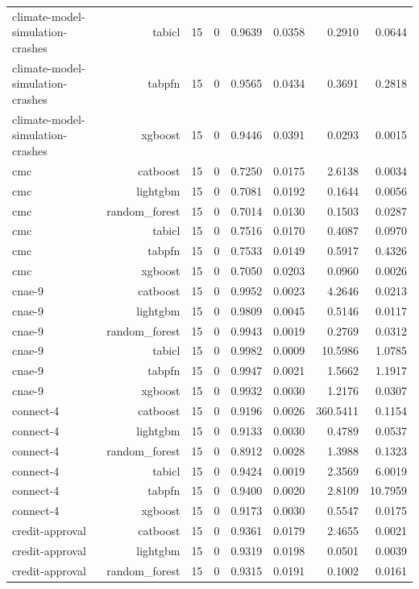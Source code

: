 \begin{table}[htbp]
\begin{tabular}{lrrrrrrr}
climate-model-simulation-crashes & tabicl & 15 & 0 & 0.9639 & 0.0358 & 0.2910 & 0.0644 \\
climate-model-simulation-crashes & tabpfn & 15 & 0 & 0.9565 & 0.0434 & 0.3691 & 0.2818 \\
climate-model-simulation-crashes & xgboost & 15 & 0 & 0.9446 & 0.0391 & 0.0293 & 0.0015 \\
cmc & catboost & 15 & 0 & 0.7250 & 0.0175 & 2.6138 & 0.0034 \\
cmc & lightgbm & 15 & 0 & 0.7081 & 0.0192 & 0.1644 & 0.0056 \\
cmc & random\_forest & 15 & 0 & 0.7014 & 0.0130 & 0.1503 & 0.0287 \\
cmc & tabicl & 15 & 0 & 0.7516 & 0.0170 & 0.4087 & 0.0970 \\
cmc & tabpfn & 15 & 0 & 0.7533 & 0.0149 & 0.5917 & 0.4326 \\
cmc & xgboost & 15 & 0 & 0.7050 & 0.0203 & 0.0960 & 0.0026 \\
cnae-9 & catboost & 15 & 0 & 0.9952 & 0.0023 & 4.2646 & 0.0213 \\
cnae-9 & lightgbm & 15 & 0 & 0.9809 & 0.0045 & 0.5146 & 0.0117 \\
cnae-9 & random\_forest & 15 & 0 & 0.9943 & 0.0019 & 0.2769 & 0.0312 \\
cnae-9 & tabicl & 15 & 0 & 0.9982 & 0.0009 & 10.5986 & 1.0785 \\
cnae-9 & tabpfn & 15 & 0 & 0.9947 & 0.0021 & 1.5662 & 1.1917 \\
cnae-9 & xgboost & 15 & 0 & 0.9932 & 0.0030 & 1.2176 & 0.0307 \\
connect-4 & catboost & 15 & 0 & 0.9196 & 0.0026 & 360.5411 & 0.1154 \\
connect-4 & lightgbm & 15 & 0 & 0.9133 & 0.0030 & 0.4789 & 0.0537 \\
connect-4 & random\_forest & 15 & 0 & 0.8912 & 0.0028 & 1.3988 & 0.1323 \\
connect-4 & tabicl & 15 & 0 & 0.9424 & 0.0019 & 2.3569 & 6.0019 \\
connect-4 & tabpfn & 15 & 0 & 0.9400 & 0.0020 & 2.8109 & 10.7959 \\
connect-4 & xgboost & 15 & 0 & 0.9173 & 0.0030 & 0.5547 & 0.0175 \\
credit-approval & catboost & 15 & 0 & 0.9361 & 0.0179 & 2.4655 & 0.0021 \\
credit-approval & lightgbm & 15 & 0 & 0.9319 & 0.0198 & 0.0501 & 0.0039 \\
credit-approval & random\_forest & 15 & 0 & 0.9315 & 0.0191 & 0.1002 & 0.0161 \\

\end{tabular}
\end{table}
